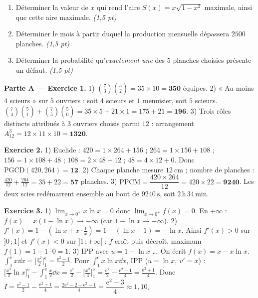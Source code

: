 \begin{enumerate}[label=\textbf{Tâche \arabic*.},leftmargin=2.4em]
\item Déterminer la valeur de $x$ qui rend l'aire $S(x)=x\sqrt{1-x^2}$ maximale, ainsi
que cette aire maximale. \hfill\textit{(1,5 pt)}
\item Déterminer le mois à partir duquel la production mensuelle dépassera $2500$ planches. \hfill\textit{(1,5 pt)}
\item Déterminer la probabilité qu'\emph{exactement une} des $5$ planches choisies
présente un défaut. \hfill\textit{(1,5 pt)}
\end{enumerate}
\par{}


\noindent\textbf{Partie A — Exercice 1.}
1) $\binom{7}{3}\binom{5}{2}=35\times10=\mathbf{350}$ équipes.
2) « Au moins $4$ scieurs » sur $5$ ouvriers : soit $4$ scieurs et $1$ menuisier,
soit $5$ scieurs. $\binom{7}{4}\binom{5}{1}+\binom{7}{5}\binom{5}{0}=35\times5+21\times1=175+21=\mathbf{196}$.
3) Trois rôles distincts attribués à $3$ ouvriers choisis parmi $12$ : arrangement
$A_{12}^{3}=12\times11\times10=\mathbf{1320}$.

\noindent\textbf{Exercice 2.}
1) Euclide : $420=1\times264+156$ ; $264=1\times156+108$ ; $156=1\times108+48$ ;
$108=2\times48+12$ ; $48=4\times12+0$. Donc $\mathrm{PGCD}(420,264)=\mathbf{12}$.
2) Chaque planche mesure $\SI{12}{\centi\metre}$ ; nombre de planches :
$\frac{420}{12}+\frac{264}{12}=35+22=\mathbf{57}$ planches.
3) $\mathrm{PPCM}=\dfrac{420\times264}{12}=420\times22=\mathbf{9240}$. Les deux scies
redémarrent ensemble au bout de $\SI{9240}{\second}$, soit $2\,\text{h}\,34\,\text{min}$.

\noindent\textbf{Exercice 3.}
1) $\lim_{x\to0^+}x\ln x=0$ donc $\lim_{x\to0^+}f(x)=0$. En $+\infty$ :
$f(x)=x(1-\ln x)\to-\infty$ (car $1-\ln x\to-\infty$).
2) $f'(x)=1-(\ln x+x\cdot\frac1x)=1-(\ln x+1)=-\ln x$. Ainsi $f'(x)>0$ sur
$]0\,;1[$ et $f'(x)<0$ sur $]1\,;+\infty[$ : $f$ croît puis décroît, maximum
$f(1)=1-1\cdot0=1$.
3) IPP avec $u=1-\ln x$ \dots\ On écrit $f(x)=x-x\ln x$.
$\int_1^{\mathrm e}x\dd x=\big[\tfrac{x^2}{2}\big]_1^{\mathrm e}=\frac{\mathrm e^2-1}{2}$.
Pour $\int_1^{\mathrm e}x\ln x\dd x$, IPP ($u=\ln x,\ v'=x$) :
$\big[\tfrac{x^2}{2}\ln x\big]_1^{\mathrm e}-\int_1^{\mathrm e}\tfrac{x}{2}\dd x
=\tfrac{\mathrm e^2}{2}-\big[\tfrac{x^2}{4}\big]_1^{\mathrm e}
=\tfrac{\mathrm e^2}{2}-\tfrac{\mathrm e^2-1}{4}=\tfrac{\mathrm e^2+1}{4}$.
Donc $I=\frac{\mathrm e^2-1}{2}-\frac{\mathrm e^2+1}{4}=\frac{2\mathrm e^2-2-\mathrm e^2-1}{4}
=\dfrac{\mathrm e^2-3}{4}\approx1{,}10$.

